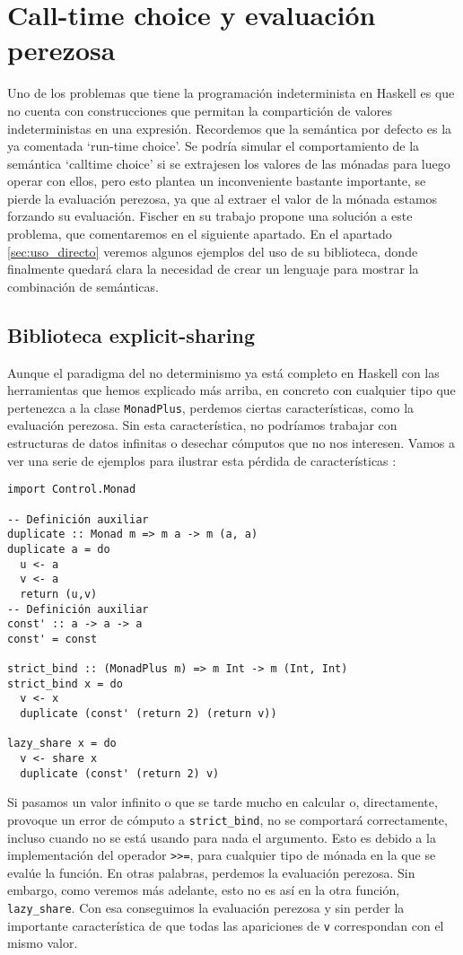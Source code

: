 \documentclass[class=article, crop=false]{standalone}
\begin{document}
\section{Call-time choice y evaluación perezosa}
Uno de los problemas que tiene la programación indeterminista en Haskell es que no cuenta con
construcciones que permitan la compartición de valores indeterministas en una expresión.
Recordemos que la semántica por defecto es la ya comentada `run-time choice'. Se podría
simular el comportamiento de la semántica `calltime choice' si se extrajesen los valores de
las mónadas para luego operar con ellos, pero esto plantea un inconveniente bastante
importante, se pierde la evaluación perezosa, ya que al extraer el valor de la mónada estamos
forzando su evaluación. Fischer en su trabajo \cite{fischer2011purely} propone una solución a
este problema, que comentaremos en el siguiente apartado. En el apartado
\ref{sec:uso_directo} veremos algunos ejemplos del uso de su biblioteca, donde finalmente
quedará clara la necesidad de crear un lenguaje para mostrar la combinación de semánticas.

\subsection{Biblioteca explicit-sharing}\label{sec:explicit_sharing}
Aunque el paradigma del no determinismo ya está completo en Haskell con las herramientas que
hemos explicado más arriba, en concreto con cualquier tipo que pertenezca a la clase
\verb`MonadPlus`, perdemos ciertas características, como la evaluación perezosa. Sin esta
característica, no podríamos trabajar con estructuras de datos infinitas o desechar cómputos
que no nos interesen. Vamos a ver una serie de ejemplos para ilustrar esta pérdida de
características \cite{fischer2011purely}:

\begin{verbatim}
import Control.Monad

-- Definición auxiliar
duplicate :: Monad m => m a -> m (a, a)
duplicate a = do
  u <- a
  v <- a
  return (u,v)
-- Definición auxiliar
const' :: a -> a -> a
const' = const

strict_bind :: (MonadPlus m) => m Int -> m (Int, Int)
strict_bind x = do
  v <- x
  duplicate (const' (return 2) (return v))

lazy_share x = do
  v <- share x
  duplicate (const' (return 2) v)
\end{verbatim}

Si pasamos un valor infinito o que se tarde mucho en calcular o, directamente, provoque un
error de cómputo a \verb`strict_bind`, no se comportará correctamente, incluso cuando no se
está usando para nada el argumento. Esto es debido a la implementación del operador
\verb`>>=`, para cualquier tipo de mónada en la que se evalúe la función. En otras palabras,
perdemos la evaluación perezosa. Sin embargo, como veremos más adelante, esto no es así en
la otra función, \verb`lazy_share`. Con esa conseguimos la evaluación perezosa y sin perder
la importante característica de que todas las apariciones de \verb`v` correspondan con el
mismo valor.
\newpage
\end{document}
